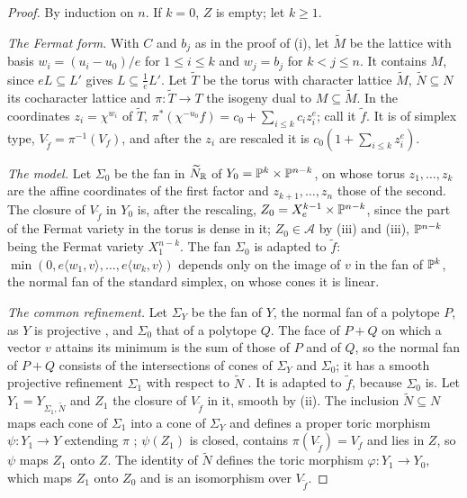 \begin{proof}
By induction on $n$. If $k=0$, $Z$ is empty; let $k\ge1$.

\emph{The Fermat form.} With $C$ and $b_{j}$ as in the proof of
(i), let $\widetilde M$ be the lattice with basis
$w_{i}=(u_{i}-u_{0})/e$ for $1\le i\le k$ and $w_{j}=b_{j}$ for $k<j\le n$.
It contains $M$, since $eL\subseteq L'$ gives $L\subseteq\frac1eL'$. Let
$\widetilde T$ be the torus with character lattice $\widetilde M$,
$\widetilde N\subseteq N$ its cocharacter lattice and
$\pi\colon\widetilde T\to T$ the isogeny dual to $M\subseteq\widetilde M$.
In the coordinates $z_{i}=\chi^{w_{i}}$ of $\widetilde T$,
$\pi^{*}(\chi^{-u_{0}}f)=c_{0}+\sum_{i\le k}c_{i}z_{i}^{e}$; call it
$\widetilde f$. It is of simplex type, $V_{\widetilde f}=\pi^{-1}(V_{f})$,
and after the $z_{i}$ are rescaled it is $c_{0}(1+\sum_{i\le k}z_{i}^{e})$.

\emph{The model.} Let $\Sigma_{0}$ be the fan in $\widetilde N_{\mathbb{R}}$ of
$Y_{0}=\mathbb{P}^{k}\times\mathbb{P}^{n-k}$, on whose torus $z_{1},\dots,z_{k}$ are the
affine coordinates of the first factor and $z_{k+1},\dots,z_{n}$ those of the
second. The closure of $V_{\widetilde f}$ in $Y_{0}$ is, after the
rescaling, $Z_{0}=X^{k-1}_{e}\times\mathbb{P}^{n-k}$, since the part of the Fermat
variety in the torus is dense in it; $Z_{0}\in\mathcal{A}$ by
(iii) and (iii), $\mathbb{P}^{n-k}$ being
the Fermat variety $X^{n-k}_{1}$. The fan $\Sigma_{0}$ is adapted to
$\widetilde f$: $\min(0,e\langle w_{1},v\rangle,\dots,e\langle
w_{k},v\rangle)$ depends only on the image of $v$ in the fan of $\mathbb{P}^{k}$,
the normal fan of the standard simplex, on whose cones it is linear.

\emph{The common refinement.} Let $\Sigma_{Y}$ be the fan of $Y$, the normal
fan of a polytope $P$, as $Y$ is projective \cite[Chapter~2]{CLS11}, and
$\Sigma_{0}$ that of a polytope $Q$. The face of $P+Q$ on which a vector $v$
attains its minimum is the sum of those of $P$ and of $Q$, so the normal fan
of $P+Q$ consists of the intersections of cones of $\Sigma_{Y}$ and
$\Sigma_{0}$; it has a smooth projective refinement $\Sigma_{1}$ with
respect to $\widetilde N$ \cite[Chapter~11]{CLS11}. It is adapted to
$\widetilde f$, because $\Sigma_{0}$ is. Let
$Y_{1}=Y_{\Sigma_{1},\widetilde N}$ and $Z_{1}$ the closure of
$V_{\widetilde f}$ in it, smooth by (ii). The
inclusion $\widetilde N\subseteq N$ maps each cone of $\Sigma_{1}$ into a cone
of $\Sigma_{Y}$ and defines a proper toric morphism $\psi\colon Y_{1}\to Y$
extending $\pi$ \cite[Chapter~3]{CLS11}; $\psi(Z_{1})$ is closed, contains
$\pi(V_{\widetilde f})=V_{f}$ and lies in $Z$, so $\psi$ maps $Z_{1}$ onto
$Z$. The identity of $\widetilde N$ defines the toric morphism
$\varphi\colon Y_{1}\to Y_{0}$, which maps $Z_{1}$ onto $Z_{0}$ and is an
isomorphism over $V_{\widetilde f}$.


\end{proof}
